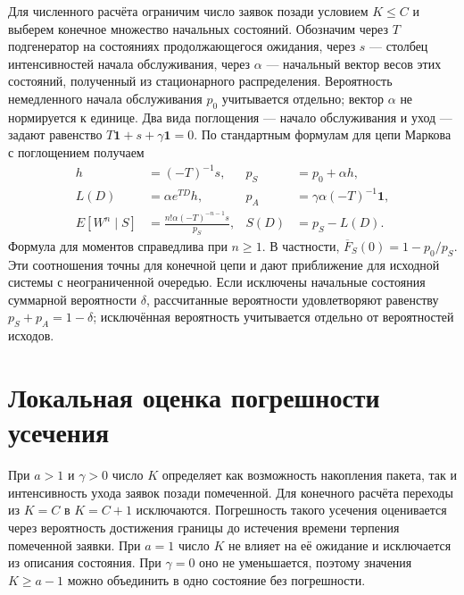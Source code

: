 Для численного расчёта ограничим число заявок позади условием $K\leq C$ и выберем конечное множество начальных состояний. Обозначим через $T$ подгенератор на состояниях продолжающегося ожидания, через $s$ --- столбец интенсивностей начала обслуживания, через $\alpha$ --- начальный вектор весов этих состояний, полученный из стационарного распределения. Вероятность немедленного начала обслуживания $p_0$ учитывается отдельно; вектор $\alpha$ не нормируется к единице. Два вида поглощения --- начало обслуживания и уход --- задают равенство $T\mathbf1+s+\gamma\mathbf1=0$. По стандартным формулам для цепи Маркова с поглощением получаем
\begin{align}
 h&=(-T)^{-1}s,& p_S&=p_0+\alpha h,\\
 L(D)&=\alpha e^{TD}h,& p_A&=\gamma\alpha(-T)^{-1}\mathbf1,\label{eq:ph}\\
 E[W^n\mid S]&=\frac{n!\alpha(-T)^{-n-1}s}{p_S},&
 S(D)&=p_S-L(D).
\end{align}
Формула для моментов справедлива при $n\geq1$. В частности, $\overline F_S(0)=1-p_0/p_S$. Эти соотношения точны для конечной цепи и дают приближение для исходной системы с неограниченной очередью. Если исключены начальные состояния суммарной вероятности $\delta$, рассчитанные вероятности удовлетворяют равенству $p_S+p_A=1-\delta$; исключённая вероятность учитывается отдельно от вероятностей исходов.

\section*{Локальная оценка погрешности усечения}

При $a>1$ и $\gamma>0$ число $K$ определяет как возможность накопления пакета, так и интенсивность ухода заявок позади помеченной. Для конечного расчёта переходы из $K=C$ в $K=C+1$ исключаются. Погрешность такого усечения оценивается через вероятность достижения границы до истечения времени терпения помеченной заявки. При $a=1$ число $K$ не влияет на её ожидание и исключается из описания состояния. При $\gamma=0$ оно не уменьшается, поэтому значения $K\geq a-1$ можно объединить в одно состояние без погрешности.

